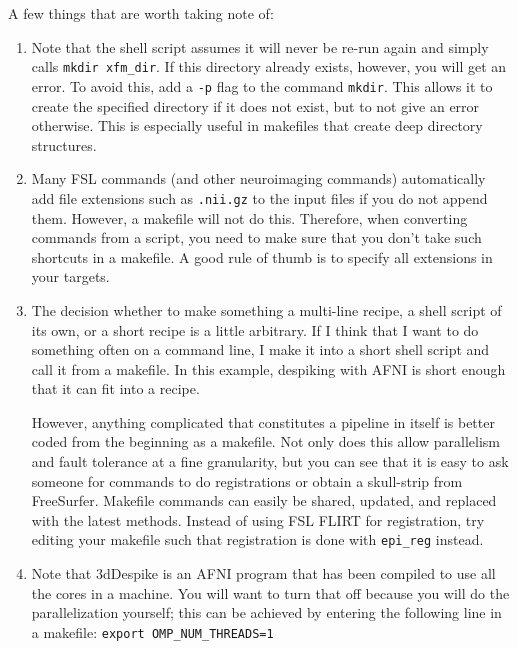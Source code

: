A few things that are worth taking note of: 
\begin{enumerate}
\item Note that the shell script assumes it will never be re-run again and simply calls \texttt{mkdir xfm_dir}. 
If this directory already exists, however, you will get an error. To avoid this, add a \texttt{-p} flag to the command \texttt{mkdir}. This allows it to create the specified directory if it does not exist, but to not give an error otherwise. This is especially useful in makefiles that create deep directory structures.

\item Many FSL commands (and other neuroimaging commands) automatically add
file extensions such as \texttt{.nii.gz} to the input files if you do not append
them. However, a makefile will not do this. Therefore, when converting
commands from a script, you need to make sure that you don't take such
shortcuts in a makefile. A good rule of thumb is to specify all extensions in your targets. 
 
\item The decision whether to make something a multi-line recipe, a shell
script of its own, or a short recipe is a little arbitrary. If I think
that I want to do something often on a command line, I make it into a
short shell script and call it from a makefile. In this example,
despiking with AFNI is short enough that it can fit into a
recipe.

However, anything complicated that constitutes a pipeline in
itself is better coded from the beginning as a makefile. Not only does
this allow parallelism and fault tolerance at a fine granularity, but
you can see that it is easy to ask someone for commands to do
registrations or obtain a skull-strip from FreeSurfer. Makefile
commands can easily be shared, updated, and replaced with the latest
methods. Instead of using FSL FLIRT for registration, try editing your makefile such that registration is done with \texttt{epi_reg} instead. 

\item Note that 3dDespike is an AFNI program that has been compiled to use all the cores in a machine. You will want to turn that off because you will do the parallelization yourself; this can be achieved by entering the following line in a makefile: \texttt{export OMP_NUM_THREADS=1}
\end{enumerate}


